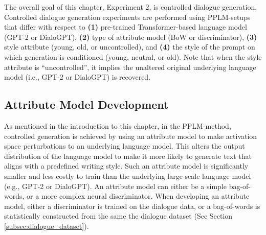 

The overall goal of this chapter, Experiment 2, is controlled dialogue generation. Controlled dialogue generation experiments are performed using PPLM-setups that differ with respect to \textbf{(1)} pre-trained Transformer-based language model (GPT-2 or DialoGPT), \textbf{(2)} type of attribute model (BoW or discriminator), \textbf{(3)} style attribute (young, old, or uncontrolled), and \textbf{(4)} the style of the prompt on which generation is conditioned (young, neutral, or old). Note that when the style attribute is ``uncontrolled'', it implies the unaltered original underlying language model (i.e., GPT-2 or DialoGPT) is recovered. 




\subsection{Attribute Model Development}
\label{subsec:att_model_dev}
As mentioned in the introduction to this chapter, in the PPLM-method, controlled generation is achieved by using an attribute model to make activation space perturbations to an underlying language model. This alters the output distribution of the language model to make it more likely to generate text that aligns with a predefined writing style. Such an attribute model is significantly smaller and less costly to train than the underlying large-scale language model (e.g., GPT-2 or DialoGPT). An attribute model can either be a simple bag-of-words, or a more complex neural discriminator. When developing an attribute model, either a discriminator is trained on the dialogue data, or a bag-of-words is statistically constructed from the same the dialogue dataset (See Section \ref{subsec:dialogue_dataset}).

